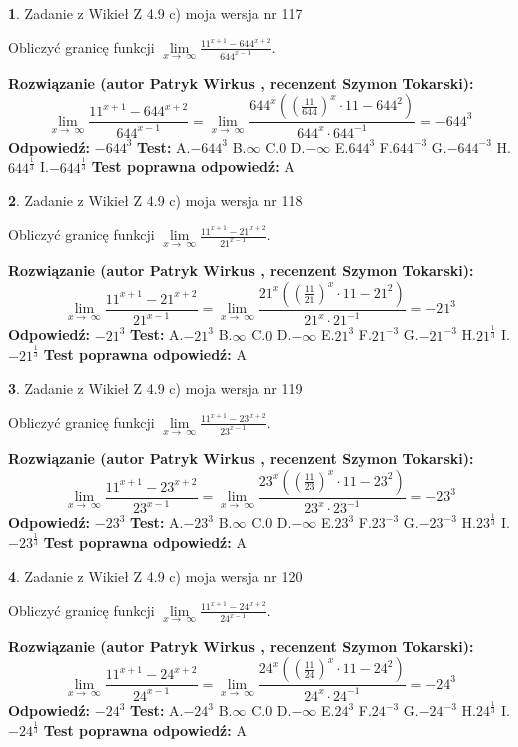 \documentclass[12pt, a4paper]{article}
\theoremstyle{definition} %
\newtheorem{zad}{}
\newcommand{\zadStart}[1]{\begin{zad}#1\newline}
\newcommand{\zadStop}{\end{zad}}
\newcommand{\rozwStart}[2]{\noindent \textbf{Rozwiązanie (autor #1 , recenzent #2): }\newline}
\newcommand{\rozwStop}{\newline}
\newcommand{\odpStart}{\noindent \textbf{Odpowiedź:}\newline}
\newcommand{\odpStop}{\newline}
\newcommand{\testStart}{\noindent \textbf{Test:}\newline}
\newcommand{\testStop}{\newline}
\newcommand{\kluczStart}{\noindent \textbf{Test poprawna odpowiedź:}\newline}
\newcommand{\kluczStop}{\newline}
\begin{document}
\zadStart{Zadanie z Wikieł Z 4.9 c) moja wersja nr 117}


Obliczyć granicę funkcji  $\lim\limits_{x\to\ \infty}\frac{11^{x+1}-644^{x+2}}{644^{x-1}}$.
\zadStop
\rozwStart{Patryk Wirkus}{Szymon Tokarski}
$$\lim\limits_{x\to\ \infty}\frac{11^{x+1}-644^{x+2}}{644^{x-1}}=\lim\limits_{x\to\ \infty}\frac{644^{x}((\frac{11}{644})^{x}\cdot 11 -644^{2})}{644^{x}\cdot 644^{-1}} = -644^{3}$$
\rozwStop
\odpStart
$-644^{3}$
\odpStop
\testStart
A.$-644^{3}$ B.$\infty$ C.$0$ D.$-\infty$ E.$644^{3}$
F.$644^{-3}$ G.$-644^{-3}$
H.$644^{\frac{1}{3}}$
I.$-644^{\frac{1}{3}}$
\testStop
\kluczStart
A
\kluczStop



\zadStart{Zadanie z Wikieł Z 4.9 c) moja wersja nr 118}


Obliczyć granicę funkcji  $\lim\limits_{x\to\ \infty}\frac{11^{x+1}-21^{x+2}}{21^{x-1}}$.
\zadStop
\rozwStart{Patryk Wirkus}{Szymon Tokarski}
$$\lim\limits_{x\to\ \infty}\frac{11^{x+1}-21^{x+2}}{21^{x-1}}=\lim\limits_{x\to\ \infty}\frac{21^{x}((\frac{11}{21})^{x}\cdot 11 -21^{2})}{21^{x}\cdot 21^{-1}} = -21^{3}$$
\rozwStop
\odpStart
$-21^{3}$
\odpStop
\testStart
A.$-21^{3}$ B.$\infty$ C.$0$ D.$-\infty$ E.$21^{3}$
F.$21^{-3}$ G.$-21^{-3}$
H.$21^{\frac{1}{3}}$
I.$-21^{\frac{1}{3}}$
\testStop
\kluczStart
A
\kluczStop



\zadStart{Zadanie z Wikieł Z 4.9 c) moja wersja nr 119}


Obliczyć granicę funkcji  $\lim\limits_{x\to\ \infty}\frac{11^{x+1}-23^{x+2}}{23^{x-1}}$.
\zadStop
\rozwStart{Patryk Wirkus}{Szymon Tokarski}
$$\lim\limits_{x\to\ \infty}\frac{11^{x+1}-23^{x+2}}{23^{x-1}}=\lim\limits_{x\to\ \infty}\frac{23^{x}((\frac{11}{23})^{x}\cdot 11 -23^{2})}{23^{x}\cdot 23^{-1}} = -23^{3}$$
\rozwStop
\odpStart
$-23^{3}$
\odpStop
\testStart
A.$-23^{3}$ B.$\infty$ C.$0$ D.$-\infty$ E.$23^{3}$
F.$23^{-3}$ G.$-23^{-3}$
H.$23^{\frac{1}{3}}$
I.$-23^{\frac{1}{3}}$
\testStop
\kluczStart
A
\kluczStop



\zadStart{Zadanie z Wikieł Z 4.9 c) moja wersja nr 120}


Obliczyć granicę funkcji  $\lim\limits_{x\to\ \infty}\frac{11^{x+1}-24^{x+2}}{24^{x-1}}$.
\zadStop
\rozwStart{Patryk Wirkus}{Szymon Tokarski}
$$\lim\limits_{x\to\ \infty}\frac{11^{x+1}-24^{x+2}}{24^{x-1}}=\lim\limits_{x\to\ \infty}\frac{24^{x}((\frac{11}{24})^{x}\cdot 11 -24^{2})}{24^{x}\cdot 24^{-1}} = -24^{3}$$
\rozwStop
\odpStart
$-24^{3}$
\odpStop
\testStart
A.$-24^{3}$ B.$\infty$ C.$0$ D.$-\infty$ E.$24^{3}$
F.$24^{-3}$ G.$-24^{-3}$
H.$24^{\frac{1}{3}}$
I.$-24^{\frac{1}{3}}$
\testStop
\kluczStart
A
\kluczStop
\end{document}

